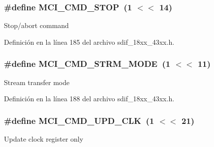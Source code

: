\subsubsection[{\texorpdfstring{M\+C\+I\+\_\+\+C\+M\+D\+\_\+\+S\+T\+OP}{MCI_CMD_STOP}}]{\setlength{\rightskip}{0pt plus 5cm}\#define M\+C\+I\+\_\+\+C\+M\+D\+\_\+\+S\+T\+OP~(1 $<$$<$ 14)}\hypertarget{group___s_d_i_f__18_x_x__43_x_x_gad72f8a7ad70a6b2b7ed2b0c4b83af706}{}\label{group___s_d_i_f__18_x_x__43_x_x_gad72f8a7ad70a6b2b7ed2b0c4b83af706}
Stop/abort command 

Definición en la línea 185 del archivo sdif\+\_\+18xx\+\_\+43xx.\+h.

\subsubsection[{\texorpdfstring{M\+C\+I\+\_\+\+C\+M\+D\+\_\+\+S\+T\+R\+M\+\_\+\+M\+O\+DE}{MCI_CMD_STRM_MODE}}]{\setlength{\rightskip}{0pt plus 5cm}\#define M\+C\+I\+\_\+\+C\+M\+D\+\_\+\+S\+T\+R\+M\+\_\+\+M\+O\+DE~(1 $<$$<$ 11)}\hypertarget{group___s_d_i_f__18_x_x__43_x_x_gad391d870e82edff9ae5f97f06871fba3}{}\label{group___s_d_i_f__18_x_x__43_x_x_gad391d870e82edff9ae5f97f06871fba3}
Stream transfer mode 

Definición en la línea 188 del archivo sdif\+\_\+18xx\+\_\+43xx.\+h.

\subsubsection[{\texorpdfstring{M\+C\+I\+\_\+\+C\+M\+D\+\_\+\+U\+P\+D\+\_\+\+C\+LK}{MCI_CMD_UPD_CLK}}]{\setlength{\rightskip}{0pt plus 5cm}\#define M\+C\+I\+\_\+\+C\+M\+D\+\_\+\+U\+P\+D\+\_\+\+C\+LK~(1 $<$$<$ 21)}\hypertarget{group___s_d_i_f__18_x_x__43_x_x_gaaab88d525cb9ac8ad728365edf24ba1a}{}\label{group___s_d_i_f__18_x_x__43_x_x_gaaab88d525cb9ac8ad728365edf24ba1a}
Update clock register only 

